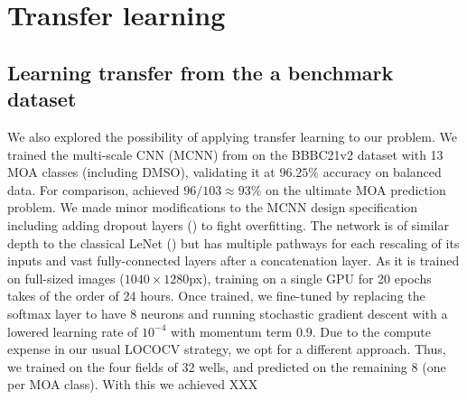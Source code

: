 
\chapter{Transfer learning} %
\label{AppendixE} %


\section{Learning transfer from the a benchmark dataset}

We also explored the possibility of applying transfer learning to our problem. We trained the multi-scale CNN (MCNN) from \cite{godinez2017multi} on the BBBC21v2 dataset with 13 MOA classes (including DMSO), validating it at $96.25\%$ accuracy on balanced data. For comparison, \cite{godinez2017multi} achieved $96/103 \approx 93\%$ on the ultimate MOA prediction problem. We made minor modifications to the MCNN design specification including adding dropout layers (\cite{srivastava2014dropout}) to fight overfitting. The network is of similar depth to the classical LeNet (\cite{lecun1998gradient}) but has multiple pathways for each rescaling of its inputs and vast fully-connected layers after a concatenation layer. As it is trained on full-sized images ($1040 \times 1280$px), training on a single GPU for 20 epochs takes of the order of 24 hours. Once trained, we fine-tuned by replacing the softmax layer to have 8 neurons and running stochastic gradient descent with a lowered learning rate of $10^{-4}$  with momentum term $0.9$. Due to the compute expense in our usual LOCOCV strategy, we opt for a different approach. Thus, we trained on the four fields of 32 wells, and predicted on the remaining 8 (one per MOA class). With this we achieved XXX



